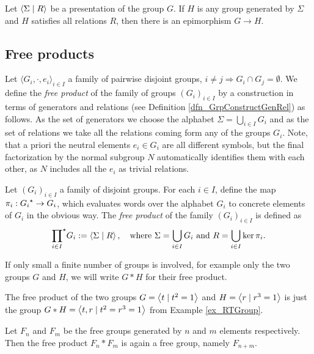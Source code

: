\begin{theorem}
Let $\left\langle \Sigma \mid R \right\rangle$ be a presentation of the group $G$. If $H$ is any group generated by $\Sigma$ and $H$ satisfies all relations $R$, then there is an epimorphism $G \to H$.
\end{theorem}

\subsection{Free products}

Let $\langle G_i, \cdot, e_i \rangle_{i \in I}$ a family of pairwise disjoint groups, \ie $i \ne j \Rightarrow G_i \cap G_j = \emptyset$. We define the \emph{free product} of the family of groups $(G_i)_{i \in I}$ by a construction in terms of generators and relations (see Definition \ref{dfn_GrpConstructGenRel}) as follows. As the set of generators we choose the alphabet $\Sigma = \bigcup_{i \in I} G_i$ and as the set of relations we take all the relations coming form any of the groups $G_i$. Note, that a priori the neutral elements $e_i \in G_i$ are all different symbols, but the final factorization by the normal subgroup $N$ automatically identifies them with each other, as $N$ includes all the $e_i$ as trivial relations.

\begin{definition}
Let $(G_i)_{i \in I}$ a family of disjoint groups. For each $i \in I$, define the map $\pi_i : {G_i}^{\star} \to G_i$, which evaluates words over the alphabet $G_i$ to concrete elements of $G_i$ in the obvious way. The \emph{free product} of the family $(G_i)_{i \in I}$ is defined as
\begin{equation*}
{\prod_{i \in I}}^{\star} G_i := \left\langle \Sigma \mid R \right\rangle, 
\quad \text{where } \Sigma = \bigcup_{i \in I} G_i \text{ and } R = \bigcup_{i \in I} \ker \pi_i.
\end{equation*} 
\end{definition}

If only small a finite number of groups is involved, for example only the two groups $G$ and $H$, we will write $G \ast H$ for their free product.

\begin{example}
The free product of the two groups $G = \left\langle t \mid t^2 = 1 \right\rangle$ and $H = \left\langle r \mid r^3 = 1 \right\rangle$ is just the group $G \ast H = \left\langle t,r \mid t^2 = r^3 = 1 \right\rangle$ from Example \ref{ex_RTGroup}.
\end{example}

\begin{example}
Let $F_n$ and $F_m$ be the free groups generated by $n$ and $m$ elements respectively. Then the free product $F_n \ast F_m$ is again a free group, namely $F_{n+m}$.
\end{example}
